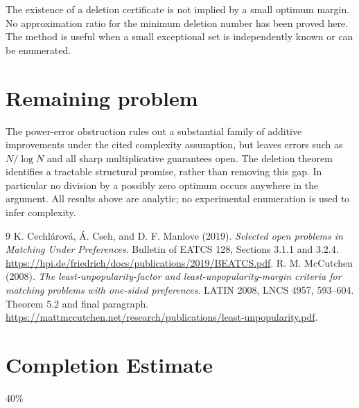 \documentclass[11pt]{article}
\theoremstyle{remark}
\begin{document}
The existence of a deletion certificate is not implied by a small
optimum margin. No approximation ratio for the minimum deletion number
has been proved here. The method is useful when a small exceptional
set is independently known or can be enumerated.

\section{Remaining problem}
The power-error obstruction rules out a substantial family of additive
improvements under the cited complexity assumption, but leaves errors
such as $N/\log N$ and all sharp multiplicative guarantees open.
The deletion theorem identifies a tractable structural promise, rather
than removing this gap. In particular no division by a possibly zero
optimum occurs anywhere in the argument. All results above are analytic;
no experimental enumeration is used to infer complexity.
\begin{thebibliography}{9}
 K. Cechl\'arov\'a, \'A. Cseh, and D. F. Manlove (2019).
\emph{Selected open problems in Matching Under Preferences}.
Bulletin of EATCS 128, Sections 3.1.1 and 3.2.4.
\url{https://hpi.de/friedrich/docs/publications/2019/BEATCS.pdf}.
 R. M. McCutchen (2008).
\emph{The least-unpopularity-factor and least-unpopularity-margin
criteria for matching problems with one-sided preferences}.
LATIN 2008, LNCS 4957, 593--604. Theorem 5.2 and final paragraph.
\url{https://mattmccutchen.net/research/publications/least-unpopularity.pdf}.
\end{thebibliography}
\section{Completion Estimate}
40\%
\end{document}
